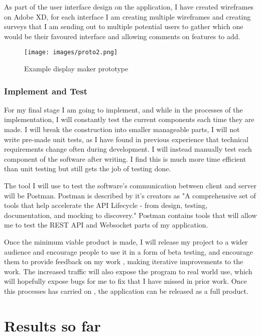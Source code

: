 \documentclass{article}
\begin{document}
As part of the user interface design on the application, I have created wireframes on Adobe XD, for each interface I am creating multiple wireframes and creating surveys that I am sending out to multiple potential users to gather which one would be their favoured interface and allowing comments on features to add.
\begin{figure}[h]
    \centering
    \texttt{[image: images/proto2.png]}
    \caption{Example display maker prototype}
    \label{fig:my_label}
\end{figure}
\subsubsection{Implement and Test}
For my final stage I am going to implement, and while in the processes of the implementation, I will constantly test the current components each time they are made. I will break the construction into smaller manageable parts, I will not write pre-made unit tests, as I have found in previous experience that technical requirements change often during development. I will instead manually test each component of the software after writing. I find this is much more time efficient than unit testing but still gets the job of testing done.  

The tool I will use to test the software's communication between client and server will be Postman. Postman is described by it's creators as "A comprehensive set of tools that help accelerate the API Lifecycle - from design, testing, documentation, and mocking to discovery."\cite{postman} Postman contains tools that will allow me to test the REST API and Websocket parts of my application.

Once the minimum viable product is made, I will release my project to a wider audience and encourage people to use it in a form of beta testing, and encourage them to provide feedback on my work , making iterative improvements to the work. The increased traffic will also expose the program to real world use, which will hopefully expose bugs for me to fix that I have missed in prior work. Once this processes has carried on , the application can be released as a full product.   



\section{Results so far}
\end{document}
